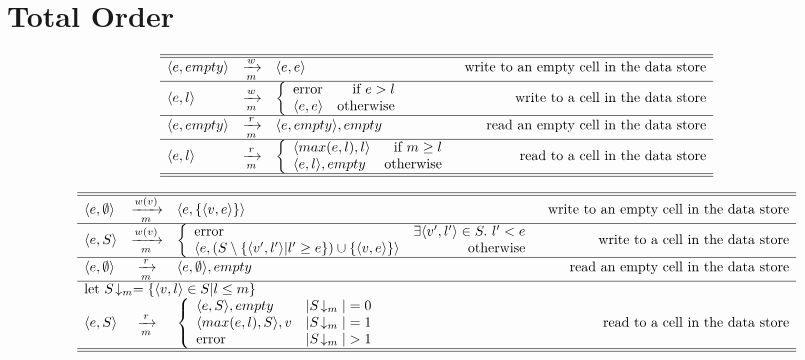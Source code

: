 \section{Total Order}

\begin{table}
\[
\begin{array}{lclr}
\hline\hline
\langle e,empty \rangle & \xrightarrow[m]{w} & \langle e,e \rangle & \mbox{write to an empty cell in the data store}\\
\hline
\langle e,l \rangle & \xrightarrow[m]{w} & \left \{ \begin{array}{lr} \mbox{error} & \mbox{if} ~ e > l \\ \langle e,e \rangle & \mbox{otherwise} \end{array} \right. & \mbox{write to a cell in the data store}\\
\hline
\langle e,empty \rangle & \xrightarrow[m]{r} & \langle e,empty \rangle, empty & \mbox{read an empty cell in the data store}\\
\hline
\langle e,l \rangle & \xrightarrow[m]{r} & \left \{ \begin{array}{lr} \langle max(e,l),l \rangle & \mbox{if} ~ m \geq l \\ \langle e,l \rangle, empty & \mbox{otherwise} \end{array} \right. & \mbox{read to a cell in the data store}\\
\hline\hline
\end{array}
\]
\caption{\label{ta:ifc-total}%
Small-step operational semantics for enforcing IFC with a total order over the security labels. $m$ is a paramater of the program execution s.t. m is the maximal security label allowed for the execution.}
\end{table}

\begin{table}
\[
\begin{array}{lclr}
\hline\hline
\semrule{\tuple{e,\emptyset}}{w(v)}{\tuple{e,\{\tuple{v,e}\}}}{\mbox{write to an empty cell in the data store}}\\
\hline
\semrule{\tuple{e,S}}
        {w(v)}
        {\case{\mbox{error}}
              {\exists \tuple{v',l'} \in S. ~ l' < e}
              {\tuple{e,(S \setminus \{\tuple{v',l'} | l' \geq e \}) \cup \{\tuple{v,e}\}}}
              {\mbox{otherwise}}}
        {\mbox{write to a cell in the data store}}\\
\hline
\semrule{\tuple{e,\emptyset}} {r} {\tuple{e,\emptyset}, empty} {\mbox{read an empty cell in the data store}}\\
\hline
\multicolumn{4} {l} {\mbox{let}~ S\!\downarrow_m = \{\tuple{v,l}\in S | l \leq m\} }\\
\semrule{\tuple{e,S}}
        {r}
        {\casethree{\tuple{e,S}, empty} {|S\!\downarrow_m| = 0}
                   {\tuple{max(e,l), S}, v} {|S\!\downarrow_m| = 1}
                   {\mbox{error}}{|S\!\downarrow_m| > 1}}
        {\mbox{read to a cell in the data store}}\\
\hline\hline
\end{array}
\]
\caption{\label{ta:ifc-total}%
Small-step operational semantics for enforcing IFC with a partial order over the security labels. $m$ is a paramater of the program execution s.t. m is the maximal security label allowed for the execution.}
\end{table}


